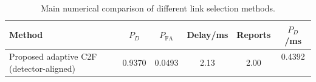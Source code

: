 \begin{table}[t]
    \centering
    \caption{Main numerical comparison of different link selection methods.}
    \label{tab:main_summary}
    \begin{tabular}{l c c c c c}
        \hline
        Method & $P_D$ & $P_{\mathrm{FA}}$ & Delay/ms & Reports & $P_D$/ms \\
        \hline
        Proposed adaptive C2F (detector-aligned) & 0.9370 & 0.0493 & 2.13 & 2.00 & 0.4392 \
        \hline
    \end{tabular}
\end{table}
